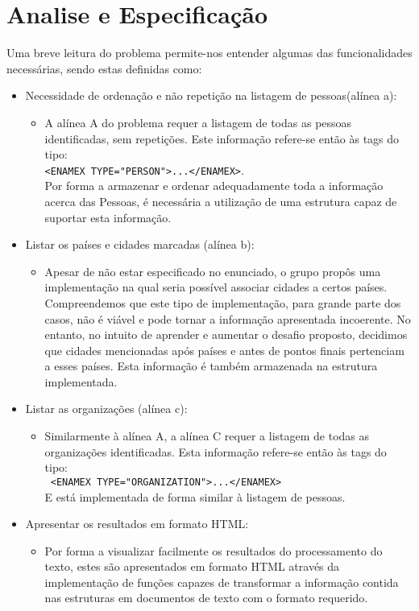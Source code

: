 \section{Analise e Especificação}
\label{seq:enamex-ana}

Uma breve leitura do problema permite-nos entender algumas das funcionalidades necessárias, sendo estas definidas como:
\begin{itemize}
\item Necessidade de ordenação e não repetição na listagem de pessoas(alínea a): \\
	\begin{itemize}
	\item A alínea A do problema requer a listagem de todas as pessoas identificadas, sem repetições. Este informação refere-se então às tags do tipo:\\
	\verb!<ENAMEX TYPE="PERSON">...</ENAMEX>!.\\
	Por forma a armazenar e ordenar adequadamente toda a informação acerca das Pessoas, é necessária a utilização de uma estrutura capaz de suportar esta informação. 
	\end{itemize}
	
\item Listar os países e cidades marcadas (alínea b): \\
	\begin{itemize}
	\item Apesar de não estar especificado no enunciado, o grupo propôs uma implementação na qual seria possível associar cidades a certos países. Compreendemos que este tipo de implementação, para grande parte dos casos, não é viável e pode tornar a informação apresentada incoerente. No entanto, no intuito de aprender e aumentar o desafio proposto, decidimos que cidades mencionadas após países e antes de pontos finais pertenciam a esses países. Esta informação é também armazenada na estrutura implementada.
	\end{itemize}
\item Listar as organizações (alínea c): \\
	\begin{itemize}
	\item Similarmente à alínea A, a alínea C requer a listagem de todas as organizações identificadas. Esta informação refere-se então às tags do tipo: \\
	\verb! <ENAMEX TYPE="ORGANIZATION">...</ENAMEX>! \\
	E está implementada de forma similar à listagem de pessoas.
	\end{itemize}
\item Apresentar os resultados em formato HTML: \\
	\begin{itemize}
	\item Por forma a visualizar facilmente os resultados do processamento do texto, estes são apresentados em formato HTML através da implementação de funções capazes de transformar a informação contida nas estruturas em documentos de texto com o formato requerido.
	\end{itemize}
\end{itemize}

